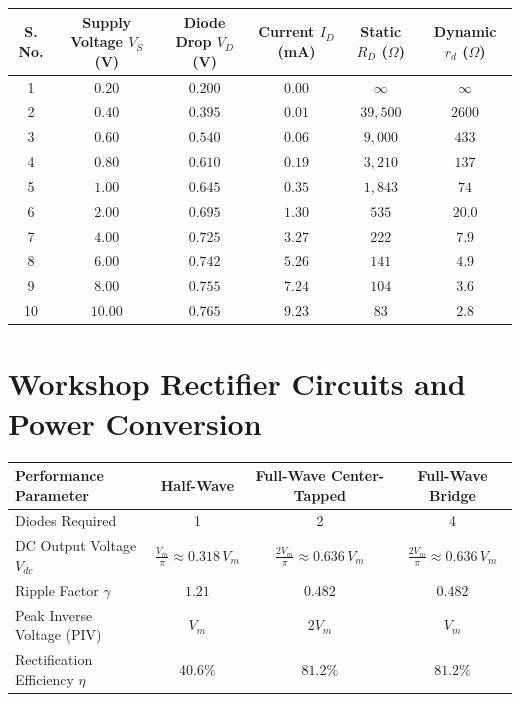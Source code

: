\begin{observationtable}
\begin{center}
\begin{tabular}{cccccc}
\toprule
\textbf{S. No.} & \textbf{Supply Voltage $V_S$ (V)} & \textbf{Diode Drop $V_D$ (V)} & \textbf{Current $I_D$ (mA)} & \textbf{Static $R_D$ ($\Omega$)} & \textbf{Dynamic $r_d$ ($\Omega$)} \\
\midrule
1 & $0.20$ & $0.200$ & $0.00$ & $\infty$ & $\infty$ \\
2 & $0.40$ & $0.395$ & $0.01$ & $39{,}500$ & $2600$ \\
3 & $0.60$ & $0.540$ & $0.06$ & $9{,}000$ & $433$ \\
4 & $0.80$ & $0.610$ & $0.19$ & $3{,}210$ & $137$ \\
5 & $1.00$ & $0.645$ & $0.35$ & $1{,}843$ & $74$ \\
6 & $2.00$ & $0.695$ & $1.30$ & $535$ & $20.0$ \\
7 & $4.00$ & $0.725$ & $3.27$ & $222$ & $7.9$ \\
8 & $6.00$ & $0.742$ & $5.26$ & $141$ & $4.9$ \\
9 & $8.00$ & $0.755$ & $7.24$ & $104$ & $3.6$ \\
10 & $10.00$ & $0.765$ & $9.23$ & $83$ & $2.8$ \\
\bottomrule
\end{tabular}
\end{center}
\end{observationtable}

\section{Workshop Rectifier Circuits and Power Conversion}
\begin{center}
\begin{tabular}{lccc}
\toprule
\textbf{Performance Parameter} & \textbf{Half-Wave} & \textbf{Full-Wave Center-Tapped} & \textbf{Full-Wave Bridge} \\
\midrule
Diodes Required & 1 & 2 & 4 \\
DC Output Voltage $V_{dc}$ & $\frac{V_m}{\pi} \approx 0.318\,V_m$ & $\frac{2 V_m}{\pi} \approx 0.636\,V_m$ & $\frac{2 V_m}{\pi} \approx 0.636\,V_m$ \\
Ripple Factor $\gamma$ & $1.21$ & $0.482$ & $0.482$ \\
Peak Inverse Voltage (PIV) & $V_m$ & $2 V_m$ & $V_m$ \\
Rectification Efficiency $\eta$ & $40.6\%$ & $81.2\%$ & $81.2\%$ \\
\bottomrule
\end{tabular}
\end{center}

